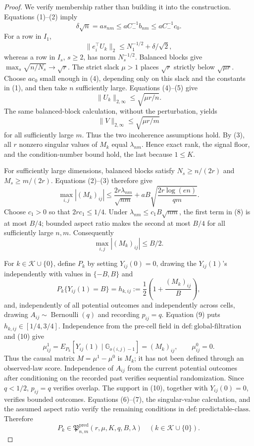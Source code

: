 \documentclass{article}
\begin{document}
\begin{proof}
We verify membership rather than building it into the construction.  Equations (1)--(2) imply
\[
 \delta\sqrt n=a s_{nm}\le aC_-^{-1}b_{nm}\le aC_-^{-1}c_0.
 \tag{4}
\]
For a row in \(I_1\),
\[
 \|e_i^\top U_k\|_2\le N_1^{-1/2}+\delta/\sqrt2,
 \tag{5}
\]
whereas a row in \(I_s\), \(s\ge2\), has norm \(N_s^{-1/2}\).  Balanced blocks give \(\max_s\sqrt{n/N_s}\to\sqrt r\).  The strict slack \(\mu>1\) places \(\sqrt r\) strictly below \(\sqrt{\mu r}\).  Choose \(ac_0\) small enough in (4), depending only on this slack and the constants in (1), and then take \(n\) sufficiently large.  Equations (4)--(5) give
\[
 \|U_k\|_{2,\infty}\le\sqrt{\mu r/n}.
 \tag{6}
\]
The same balanced-block calculation, without the perturbation, yields
\[
 \|V\|_{2,\infty}\le\sqrt{\mu r/m}
 \tag{7}
\]
for all sufficiently large \(m\).  Thus the two incoherence assumptions hold.  By (3), all \(r\) nonzero singular values of \(M_k\) equal \(\lambda_{nm}\).  Hence exact rank, the signal floor, and the condition-number bound hold, the last because \(1\le K\).

For sufficiently large dimensions, balanced blocks satisfy \(N_s\ge n/(2r)\) and \(M_s\ge m/(2r)\).  Equations (2)--(3) therefore give
\[
 \max_{i,j}|(M_k)_{ij}|
 \le \frac{2r\lambda_{nm}}{\sqrt{nm}}
     +aB\sqrt{\frac{2r\log(en)}{qm}}.
 \tag{8}
\]
Choose \(c_1>0\) so that \(2rc_1\le1/4\).  Under \(\lambda_{nm}\le c_1B\sqrt{nm}\), the first term in (8) is at most \(B/4\); bounded aspect ratio makes the second at most \(B/4\) for all sufficiently large \(n,m\).  Consequently
\[
 \max_{i,j}|(M_k)_{ij}|\le B/2.
 \tag{9}
\]

For \(k\in\mathcal K\cup\{0\}\), define \(P_k\) by setting \(Y_{ij}(0)=0\), drawing the \(Y_{ij}(1)\)'s independently with values in \(\{-B,B\}\) and
\[
 P_k\{Y_{ij}(1)=B\}
 =h_{k,ij}:=\frac12\left(1+\frac{(M_k)_{ij}}B\right),
 \tag{10}
\]
and, independently of all potential outcomes and independently across cells, drawing \(A_{ij}\sim\operatorname{Bernoulli}(q)\) and recording \(p_{ij}=q\).  Equation (9) puts \(h_{k,ij}\in[1/4,3/4]\).  Independence from the pre-cell field in \(\mathrm{def:global\mbox{-}filtration}\) and (10) give
\[
 \mu^1_{ij}=E_{P_k}[Y_{ij}(1)\mid\mathbb G_{o(i,j)-1}]=(M_k)_{ij},
 \qquad \mu^0_{ij}=0.
 \tag{11}
\]
Thus the causal matrix \(M=\mu^1-\mu^0\) is \(M_k\); it has not been defined through an observed-law score.  Independence of \(A_{ij}\) from the current potential outcomes after conditioning on the recorded past verifies sequential randomization.  Since \(q<1/2\), \(p_{ij}=q\) verifies overlap.  The support in (10), together with \(Y_{ij}(0)=0\), verifies bounded outcomes.  Equations (6)--(7), the singular-value calculation, and the assumed aspect ratio verify the remaining conditions in \(\mathrm{def:predictable\mbox{-}class}\).  Therefore
\[
 P_k\in\mathfrak P^{\mathrm{pred}}_{n,m}(r,\mu,K,q,B,\lambda)
 \quad(k\in\mathcal K\cup\{0\}).
 \tag{12}
\]


\end{proof}
\end{document}
